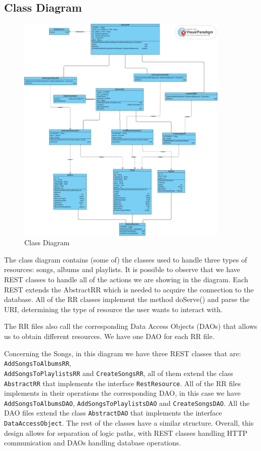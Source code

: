 \subsection{Class Diagram}


\begin{figure}[h!]
\centering
\includegraphics[width=0.9\textwidth]{sections/BLL/classdiagram.png}
\caption{Class Diagram}
\end{figure}


The class diagram contains (some of) the classes used to handle three types of resources: songs, albums and playlists. It is possible to observe that we have REST classes to handle all of the actions we are showing in the diagram. Each REST extends the AbstractRR which is needed to acquire the connection to the database. All of the RR classes implement the method doServe() and parse the URI, determining the type of resource the user wants to interact with.

The RR files also call the corresponding Data Access Objects (DAOs) that allows us to obtain different resources. We have one DAO for each RR file.

Concerning the Songs, in this diagram we have three REST classes that are: \verb|AddSongsToAlbumsRR|, \\
\verb|AddSongsToPlaylistsRR| and \verb|CreateSongsRR|, all of them extend the class \verb|AbstractRR| that implements the interface \verb|RestResource|. All of the RR files implements in their operations the corresponding DAO, in this case we have \verb|AddSongsToAlbumsDAO|, \verb|AddSongsToPlaylistsDAO| and \verb|CreateSongsDAO|. All the DAO files extend the class \verb|AbstractDAO| that implements the interface \verb|DataAccessObject|.
The rest of the classes have a similar structure. Overall, this design allows for separation of logic paths, with REST classes handling HTTP communication and DAOs handling database operations.

